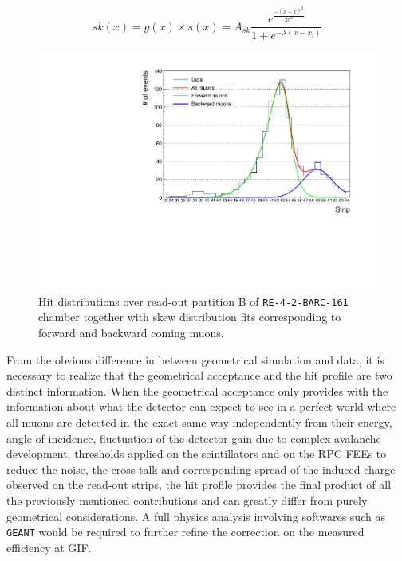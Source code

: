 	\begin{equation}
	\label{eq:skew}
	sk(x) = g(x)\times s(x) = A_{sk}\frac{e^{\frac{-(x-\bar{x})^2}{2\sigma^2}}}{1+e^{-\lambda(x-x_i)}}
	\end{equation}

	\begin{figure}[H]
            \centering
		\includegraphics[width = 0.7\plotwidth]{fig/chapt5/Cosmic-data-21-skew-fit.pdf}
		\caption{\label{fig:Fit-data} Hit distributions over read-out partition B of \texttt{RE-4-2-BARC-161} chamber together with skew distribution fits corresponding to forward and backward coming muons.}
	\end{figure}
	
	From the obvious difference in between geometrical simulation and data, it is necessary to realize that the geometrical acceptance and the hit profile are two distinct information. When the geometrical acceptance only provides with the information about what the detector can expect to see in a perfect world where all muons are detected in the exact same way independently from their energy, angle of incidence, fluctuation of the detector gain due to complex avalanche development, thresholds applied on the scintillators and on the RPC FEEs to reduce the noise, the cross-talk and corresponding spread of the induced charge observed on the read-out strips, the hit profile provides the final product of all the previously mentioned contributions and can greatly differ from purely geometrical considerations. A full physics analysis involving softwares such as \texttt{GEANT} would be required to further refine the correction on the measured efficiency at GIF.
	
